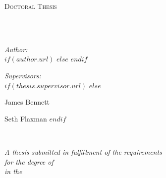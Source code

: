 \frontmatter %

\pagestyle{plain} %


\begin{titlepage}
\begin{center}

\vspace*{.06\textheight}
{\scshape\LARGE \univname\par}\vspace{1.5cm} %
\textsc{\Large Doctoral Thesis}\\[0.5cm] %

\HRule \\[0.4cm] %
{\huge \bfseries \ttitle\par}\vspace{0.4cm} %
\HRule \\[1.5cm] %
 
\begin{minipage}[t]{0.4\textwidth}
\begin{flushleft} \large
\emph{Author:}\\
$if(author.url)$
\href{$author.url$}{\authorname} %
$else$
\authorname
$endif$
\end{flushleft}
\end{minipage}
\begin{minipage}[t]{0.4\textwidth}
\begin{flushright} \large
\emph{Supervisors:} \\
$if(thesis.supervisor.url)$%
\href{$thesis.supervisor.url$}{\supname} %
$else$%
\supname

James Bennett

Seth Flaxman
$endif$
\end{flushright}
\end{minipage}\\[3cm]
 
\vfill

\large \textit{A thesis submitted in fulfillment of the requirements\\ for the degree of \degreename}\\[0.3cm] %
\textit{in the}\\[0.4cm]
\groupname\\
\deptname\\[2cm] %
 

\end{center}
\end{titlepage}
